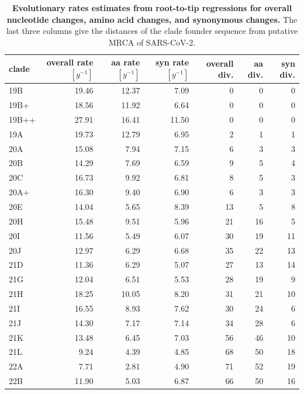 \documentclass[aps,rmp, twocolumn]{revtex4}
\begin{document}
\begin{table}
\begin{tabular}{l|rrrrrr}
    \hline
    {\bf clade} &  overall rate $[y^{-1}]$ & aa rate $[y^{-1}]$ &  syn rate $[y^{-1}]$ & overall div. &  aa div. &  syn div. \\
    \hline
    19B &     19.46 &    12.37 &      7.09 &        0 &       0 &        0 \\
   19B+ &     18.56 &    11.92 &      6.64 &        0 &       0 &        0 \\
  19B++ &     27.91 &    16.41 &     11.50 &        0 &       0 &        0 \\
  19A &     19.73 &    12.79 &      6.95 &        2 &       1 &        1 \\
  20A &     15.08 &     7.94 &      7.15 &        6 &       3 &        3 \\
    20B &     14.29 &     7.69 &      6.59 &        9 &       5 &        4 \\
    20C &     16.73 &     9.92 &      6.81 &        8 &       5 &        3 \\
   20A+ &     16.30 &     9.40 &      6.90 &        6 &       3 &        3 \\
    20E &     14.04 &     5.65 &      8.39 &       13 &       5 &        8 \\
    20H &     15.48 &     9.51 &      5.96 &       21 &      16 &        5 \\
    20I &     11.56 &     5.49 &      6.07 &       30 &      19 &       11 \\
    20J &     12.97 &     6.29 &      6.68 &       35 &      22 &       13 \\
    21D &     11.36 &     6.29 &      5.07 &       27 &      13 &       14 \\
    21G &     12.04 &     6.51 &      5.53 &       28 &      19 &        9 \\
    21H &     18.25 &    10.05 &      8.20 &       31 &      21 &       10 \\
    21I &     16.55 &     8.93 &      7.62 &       30 &      24 &        6 \\
    21J &     14.30 &     7.17 &      7.14 &       34 &      28 &        6 \\
    21K &     13.48 &     6.45 &      7.03 &       56 &      46 &       10 \\
    21L &      9.24 &     4.39 &      4.85 &       68 &      50 &       18 \\
    22A &      7.71 &     2.81 &      4.90 &       71 &      52 &       19 \\
    22B &     11.90 &     5.03 &      6.87 &       66 &      50 &       16 \\
           \hline
    \end{tabular}
\caption{{\bf Evolutionary rates estimates from root-to-tip regressions for overall nucleotide changes, amino acid changes, and synonymous changes.}
    The last three columns give the distances of the clade founder sequence from putative MRCA of SARS-CoV-2.
\label{tab:rates}}
\end{table}
\end{document}
